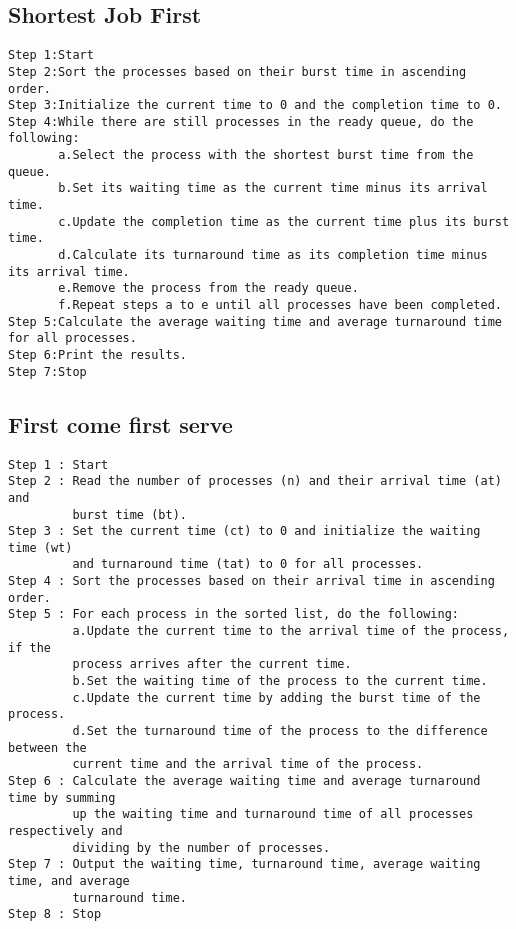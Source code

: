 \documentclass{article}
\begin{document}
\subsection{Shortest Job First}
\begin{Verbatim}[tabsize = 4]
Step 1:Start
Step 2:Sort the processes based on their burst time in ascending order.
Step 3:Initialize the current time to 0 and the completion time to 0.
Step 4:While there are still processes in the ready queue, do the following:
       a.Select the process with the shortest burst time from the queue.
       b.Set its waiting time as the current time minus its arrival time.
       c.Update the completion time as the current time plus its burst time.
       d.Calculate its turnaround time as its completion time minus its arrival time.
       e.Remove the process from the ready queue.
       f.Repeat steps a to e until all processes have been completed.
Step 5:Calculate the average waiting time and average turnaround time for all processes.
Step 6:Print the results.
Step 7:Stop
\end{Verbatim}
\subsection{First come first serve}
\begin{Verbatim}[tabsize = 4]
Step 1 : Start
Step 2 : Read the number of processes (n) and their arrival time (at) and 
         burst time (bt).
Step 3 : Set the current time (ct) to 0 and initialize the waiting time (wt) 
         and turnaround time (tat) to 0 for all processes.
Step 4 : Sort the processes based on their arrival time in ascending order.
Step 5 : For each process in the sorted list, do the following:
         a.Update the current time to the arrival time of the process, if the 
         process arrives after the current time.
         b.Set the waiting time of the process to the current time.
         c.Update the current time by adding the burst time of the process.
         d.Set the turnaround time of the process to the difference between the 
         current time and the arrival time of the process.
Step 6 : Calculate the average waiting time and average turnaround time by summing 
         up the waiting time and turnaround time of all processes respectively and 
         dividing by the number of processes.
Step 7 : Output the waiting time, turnaround time, average waiting time, and average
         turnaround time.
Step 8 : Stop
\end{Verbatim}
\end{document}

